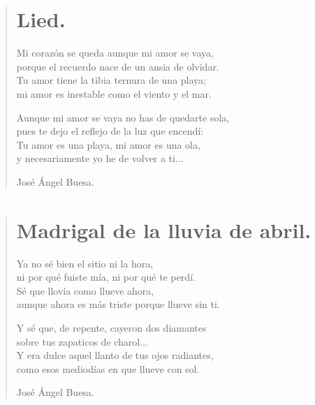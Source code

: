 \documentclass[11pt, portrait, twoside, notitlepage, openright]{book}
\begin{document}
\newpage
\begin{verse}
\begin{center}
\section{Lied.}
\end{center}
Mi corazón se queda aunque mi amor se vaya,\\
porque el recuerdo nace de un ansia de olvidar.\\
Tu amor tiene la tibia ternura de una playa;\\
mi amor es inestable como el viento y el mar.
\newline

Aunque mi amor se vaya no has de quedarte sola,\\
pues te dejo el reflejo de la luz que encendí:\\
Tu amor es una playa, mi amor es una ola,\\
y necesariamente yo he de volver a ti...
\newline

José Ángel Buesa.
\end{verse}

\newpage
\begin{verse}
\begin{center}
\section{Madrigal de la lluvia de abril.}
\end{center}
Ya no sé bien el sitio ni la hora,\\
ni por qué fuiste mía, ni por qué te perdí.\\
Sé que llovía como llueve ahora,\\
aunque ahora es más triste porque llueve sin ti.
\newline

Y sé que, de repente, cayeron dos diamantes\\
sobre tus zapaticos de charol...\\
Y era dulce aquel llanto de tus ojos radiantes,\\
como esos mediodías en que llueve con sol.
\newline

José Ángel Buesa.
\end{verse}
\end{document}
